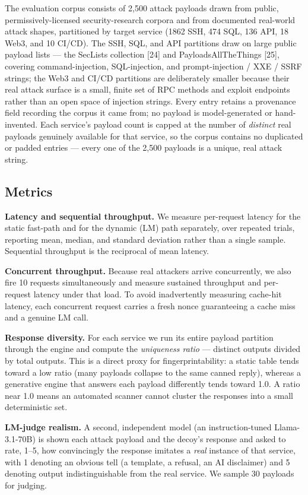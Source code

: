 \documentclass[conference]{IEEEtran}
\begin{document}
The evaluation corpus consists of 2,500 attack payloads drawn from public, permissively-licensed security-research corpora and from documented real-world attack shapes, partitioned by target service (1862 SSH, 474 SQL, 136 API, 18 Web3, and 10 CI/CD). The SSH, SQL, and API partitions draw on large public payload lists --- the SecLists collection [24] and PayloadsAllTheThings [25], covering command-injection, SQL-injection, and prompt-injection / XXE / SSRF strings; the Web3 and CI/CD partitions are deliberately smaller because their real attack surface is a small, finite set of RPC methods and exploit endpoints rather than an open space of injection strings. Every entry retains a provenance field recording the corpus it came from; no payload is model-generated or hand-invented. Each service's payload count is capped at the number of \emph{distinct} real payloads genuinely available for that service, so the corpus contains no duplicated or padded entries --- every one of the 2,500 payloads is a unique, real attack string.

\subsection{Metrics}

\textbf{Latency and sequential throughput.} We measure per-request latency for the static fast-path and for the dynamic (LM) path separately, over repeated trials, reporting mean, median, and standard deviation rather than a single sample. Sequential throughput is the reciprocal of mean latency.

\textbf{Concurrent throughput.} Because real attackers arrive concurrently, we also fire 10 requests simultaneously and measure sustained throughput and per-request latency under that load. To avoid inadvertently measuring cache-hit latency, each concurrent request carries a fresh nonce guaranteeing a cache miss and a genuine LM call.

\textbf{Response diversity.} For each service we run its entire payload partition through the engine and compute the \emph{uniqueness ratio} --- distinct outputs divided by total outputs. This is a direct proxy for fingerprintability: a static table tends toward a low ratio (many payloads collapse to the same canned reply), whereas a generative engine that answers each payload differently tends toward 1.0. A ratio near 1.0 means an automated scanner cannot cluster the responses into a small deterministic set.

\textbf{LM-judge realism.} A second, independent model (an instruction-tuned Llama-3.1-70B) is shown each attack payload and the decoy's response and asked to rate, 1--5, how convincingly the response imitates a \emph{real} instance of that service, with 1 denoting an obvious tell (a template, a refusal, an AI disclaimer) and 5 denoting output indistinguishable from the real service. We sample 30 payloads for judging.
\end{document}
